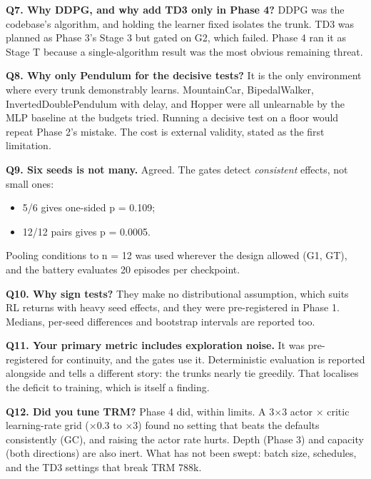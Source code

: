 \documentclass[11pt]{article}
\begin{document}
\textbf{Q7. Why DDPG, and why add TD3 only in Phase 4?} DDPG was the codebase's algorithm, and holding the learner fixed isolates the trunk. TD3 was planned as Phase 3's Stage 3 but gated on G2, which failed. Phase 4 ran it as Stage T because a single-algorithm result was the most obvious remaining threat.



\textbf{Q8. Why only Pendulum for the decisive tests?} It is the only environment where every trunk demonstrably learns. MountainCar, BipedalWalker, InvertedDoublePendulum with delay, and Hopper were all unlearnable by the MLP baseline at the budgets tried. Running a decisive test on a floor would repeat Phase 2's mistake. The cost is external validity, stated as the first limitation.



\textbf{Q9. Six seeds is not many.} Agreed. The gates detect \emph{consistent} effects, not small ones:

\begin{itemize}
\item 5/6 gives one-sided p = 0.109;
\item 12/12 pairs gives p = 0.0005.
\end{itemize}



Pooling conditions to n = 12 was used wherever the design allowed (G1, GT), and the battery evaluates 20 episodes per checkpoint.



\textbf{Q10. Why sign tests?} They make no distributional assumption, which suits RL returns with heavy seed effects, and they were pre-registered in Phase 1. Medians, per-seed differences and bootstrap intervals are reported too.



\textbf{Q11. Your primary metric includes exploration noise.} It was pre-registered for continuity, and the gates use it. Deterministic evaluation is reported alongside and tells a different story: the trunks nearly tie greedily. That localises the deficit to training, which is itself a finding.



\textbf{Q12. Did you tune TRM?} Phase 4 did, within limits. A 3$\times$3 actor $\times$ critic learning-rate grid ($\times$0.3 to $\times$3) found no setting that beats the defaults consistently (GC), and raising the actor rate hurts. Depth (Phase 3) and capacity (both directions) are also inert. What has not been swept: batch size, schedules, and the TD3 settings that break TRM 788k.
\end{document}
